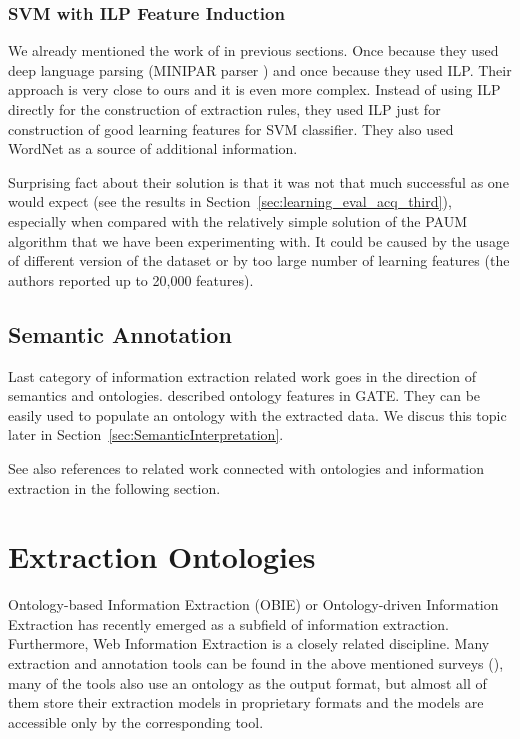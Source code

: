 \subsubsection{SVM with ILP Feature Induction}

We already mentioned the work of \cite{DBLP:conf/ilp/RamakrishnanJBS07} in previous sections. Once because they used deep language parsing (MINIPAR parser \citep{minipar}) and once because they used ILP. Their approach is very close to ours and it is even more complex. Instead of using ILP directly for the construction of extraction rules, they used ILP just for construction of good learning features for SVM classifier. They also used WordNet as a source of additional information. 

Surprising fact about their solution is that it was not that much successful as one would expect (see the results in Section~\ref{sec:learning_eval_acq_third}), especially when compared with the relatively simple solution of the PAUM algorithm that we have been experimenting with. It could be caused by the usage of different version of the dataset or by too large number of learning features (the authors reported up to 20,000 features).


\subsection{Semantic Annotation}
Last category of information extraction related work goes in the direction of semantics and ontologies. \cite{Bon04b} described  ontology features in GATE. They can be easily used to populate an ontology with the extracted data. We discus this topic later in Section~\ref{sec:SemanticInterpretation}.

See also references to related work connected with ontologies and information extraction in the following section. 


\section{Extraction Ontologies} \label{sec:relwork_ext_ont}

Ontology-based Information Extraction (OBIE) \citep{citeulike:7291004} or Ontology-driven Information Extraction \citep{Yildiz:2007:OMO:1793154.1793216} has recently emerged as a subfield of information extraction. Furthermore, Web Information Extraction \citep{biblio:Survey_of_Web_Information_Extraction_Systems} is a closely related discipline. Many extraction and annotation tools can be found in the above mentioned surveys (\citep{biblio:Survey_of_Web_Information_Extraction_Systems}), many of the tools also use an ontology as the output format, but almost all of them store their extraction models in proprietary formats and the models are accessible only by the corresponding tool.

